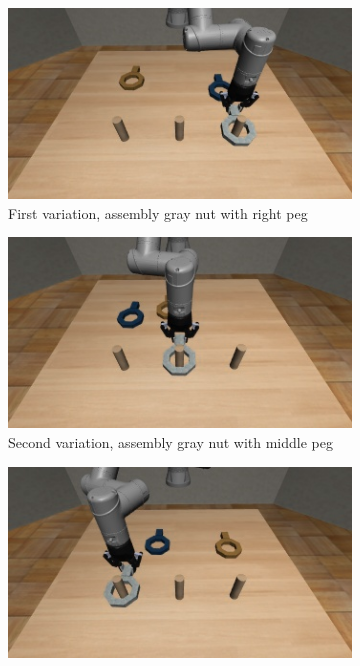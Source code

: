 \begin{figure}[hbt!]
    \centering
    \begin{subfigure}{0.2\textwidth}
        \centering
        \includegraphics[width=\textwidth]{Figures/images/nut_assembly/task_1.png}
        \caption{First variation, assembly gray nut with right peg}
        \label{fig:first_variation_nut}
    \end{subfigure}
    \hspace{30px}
    \begin{subfigure}{0.2\textwidth}
        \centering
        \includegraphics[width=\textwidth]{Figures/images/nut_assembly/task_2.png}
        \caption{Second variation, assembly gray nut with middle peg}
        \label{fig:second_variation_nut}
    \end{subfigure}
    \hspace{30px}
    \begin{subfigure}{0.2\textwidth}
        \centering
        \includegraphics[width=\textwidth]{Figures/images/nut_assembly/task_3.png}

\end{subfigure}
\end{figure}
